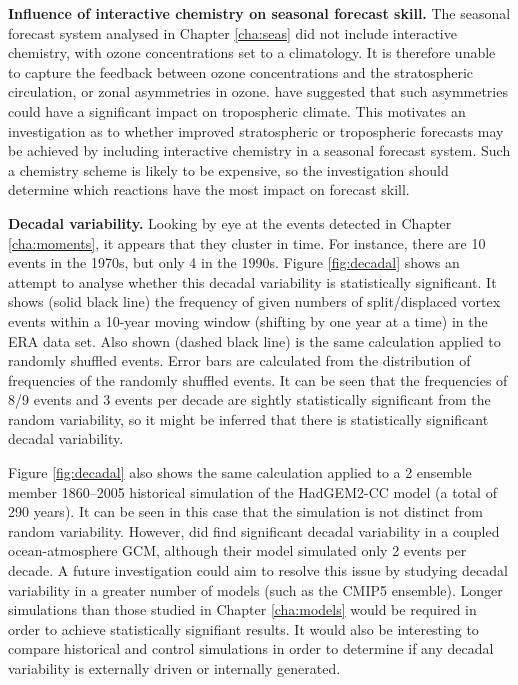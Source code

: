 \bigskip\noindent\textbf{Influence of interactive chemistry on seasonal forecast
  skill.} The seasonal forecast system analysed in Chapter \ref{cha:seas} did
not include interactive chemistry, with ozone concentrations set to a
climatology. It is therefore unable to capture the feedback between ozone
concentrations and the stratospheric circulation, or zonal asymmetries in
ozone. \citet{Waugh2009} have suggested that such asymmetries could have a
significant impact on tropospheric climate. This motivates an investigation as
to whether improved stratospheric or tropospheric forecasts may be achieved by
including interactive chemistry in a seasonal forecast system. Such a chemistry
scheme is likely to be expensive, so the investigation should determine which
reactions have the most impact on forecast skill.  


\bigskip\noindent\textbf{Decadal variability.} Looking by eye at the events
detected in Chapter \ref{cha:moments}, it appears that they cluster in time. For
instance, there are 10 events in the 1970s, but only 4 in the 1990s. Figure
\ref{fig:decadal} shows an attempt to analyse whether this decadal variability
is statistically significant. It shows (solid black line) the frequency of given
numbers of split/displaced vortex events within a 10-year moving window
(shifting by one year at a time) in the ERA data set. Also shown (dashed black
line) is the same calculation applied to randomly shuffled events. Error bars
are calculated from the distribution of frequencies of the randomly shuffled
events. It can be seen that the frequencies of 8/9 events and 3 events per
decade are sightly statistically significant from the random
variability, so it might be inferred that there is statistically significant
decadal variability. 

Figure \ref{fig:decadal} also shows the same calculation applied to a 2 ensemble
member 1860--2005 historical simulation of the HadGEM2-CC model (a total of 290
years). It can be seen in this case that the simulation is not distinct from
random variability. However, \citet{Schimanke2011} did find significant decadal
variability in a coupled ocean-atmosphere GCM, although their model simulated
only 2 events per decade. A future investigation could aim to resolve this issue
by studying decadal variability in a greater number of models (such as the CMIP5
ensemble). Longer simulations than those studied in Chapter \ref{cha:models}
would be required in order to achieve statistically signifiant results. It would
also be interesting to compare historical and control simulations in order to
determine if any decadal variability is externally driven or internally
generated.

